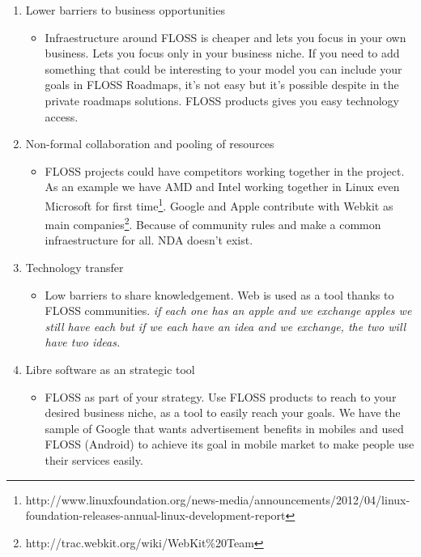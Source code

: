 \begin{enumerate}
    \item Lower barriers to business opportunities
    \begin{itemize}
        \item Infraestructure around FLOSS is cheaper and lets you focus in your own business. Lets you focus only in your business niche. If you need to add something that could be interesting to your model you can include your goals in FLOSS Roadmaps, it's not easy but it's possible despite in the private roadmaps solutions. FLOSS products gives you easy technology access.
    \end{itemize}

    \item Non-formal collaboration and pooling of resources
    \begin{itemize}
        \item FLOSS projects could have competitors working together in the project. As an example we have AMD and Intel working together in Linux even Microsoft for first time\footnote{http://www.linuxfoundation.org/news-media/announcements/2012/04/linux-foundation-releases-annual-linux-development-report}. Google and Apple contribute with Webkit as main companies\footnote{http://trac.webkit.org/wiki/WebKit\%20Team}. Because of community rules and make a common infraestructure for all. NDA doesn't exist.
    \end{itemize}

    \item Technology transfer
    \begin{itemize}
        \item Low barriers to share knowledgement. Web is used as a tool thanks to FLOSS communities. \emph{if each one has an apple and we exchange apples we still have each but if we each have an idea and we exchange, the two will have two ideas.}
    \end{itemize}

    \item Libre software as an strategic tool
    \begin{itemize}
        \item FLOSS as part of your strategy. Use FLOSS products to reach to your desired business niche, as a tool to easily reach your goals. We have the sample of Google that wants advertisement benefits in mobiles and used FLOSS (Android) to achieve its goal in mobile market to make people use their services easily.
    \end{itemize}

\end{enumerate}

